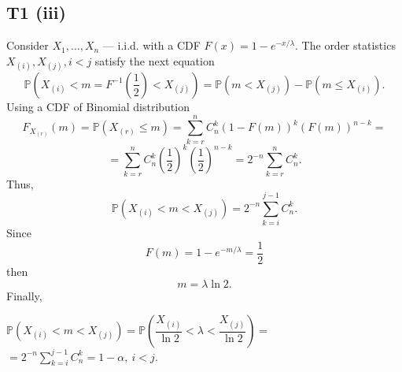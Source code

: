 \documentclass[a4paper, 12pt]{article}
\renewcommand*{\P}{\mathbb{P}}
\begin{document}
\subsection*{T1 (iii)}
Consider $X_1, \ldots, X_n$ --- i.i.d. with a CDF $F(x) = 1 - e^{-x / \lambda}.$ The order statistics $X_{(i)}, X_{(j)}, i < j$ satisfy the next equation
$$
\P \left(X_{(i)} < m = F^{-1} \left( \dfrac{1}{2} \right) < X_{(j)} \right) = \P (m < X_{(j)}) - \P (m \leqslant X_{(i)}). 
$$
Using a CDF of Binomial distribution
$$
F_{X_{(r)}}(m) = \P (X_{(r)} \leqslant m) = \sum \limits_{k=r}^n C_n^k (1 - F(m))^k (F(m))^{n-k} =$$ 
$$
= \sum \limits_{k=r}^n C_n^k \left( \dfrac{1}{2} \right)^k \left( \dfrac{1}{2} \right)^{n-k} 
= 2^{-n} \sum \limits_{k=r}^n C_n^k.
$$
Thus,
$$
\P \left(X_{(i)} < m < X_{(j)} \right) = 2^{-n} \sum \limits_{k=i}^{j-1} C_n^k.
$$
Since 
$$
F(m) = 1 - e^{-m / \lambda} = \dfrac{1}{2}
$$ 
then 
$$
m = \lambda \ln 2.
$$
Finally, 
\begin{tcolorbox}
[enhanced,width=\textwidth,center upper,
 fontupper=\large\bfseries,
 drop fuzzy shadow southeast,
 colframe=red!50!black,colback=yellow!25]
$
\P (X_{(i)} < m < X_{(j)}) = \P \left( \dfrac{X_{(i)}}{\ln 2} < \lambda < \dfrac{X_{(j)}}{\ln 2} \right) =
$
$
= 2^{-n} \sum \limits_{k=i}^{j-1} C_n^k = 1 - \alpha, ~ i < j.
$
\end{tcolorbox}
\end{document}
